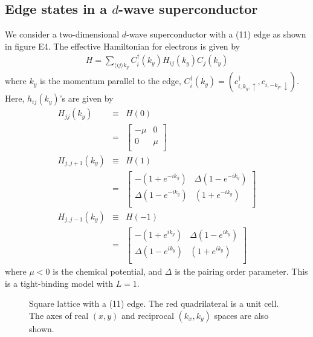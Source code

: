 \documentclass[aps,pra,amsmath,twocolumn,showpacs,bibnotes,10pt]{revtex4-1}
\begin{document}
\subsection{Edge states in a $d$-wave superconductor}

We consider a two-dimensional $d$-wave superconductor with a (11) edge as shown in figure E4. The effective Hamiltonian for electrons is given by 
\begin{eqnarray}
H = \sum_{\langle ij\rangle k_y}C^{\dagger}_i(k_y)H_{ij}(k_y)C_j(k_y) \label{hms}
\end{eqnarray}
where $k_y$ is the momentum parallel to the edge, $C^{\dagger}_i (k_y)= (c^{\dagger}_{i,k_y,\uparrow},c_{i,-k_y,\downarrow})$. Here, $h_{ij}(k_y)$'s are given by 
\begin{eqnarray}
H_{jj}(k_y) &\equiv& H(0) \nonumber\\
&=& \begin{bmatrix}
	-\mu&0\\
	0&\mu\\
\end{bmatrix}\nonumber\\
H_{j,j+1}(k_y) &\equiv& H(1) \nonumber\\
&=& \begin{bmatrix}
	-(1+e^{-ik_y})&\Delta(1-e^{-ik_y})\\
	\Delta(1-e^{-ik_y})&(1+e^{-ik_y})\\
\end{bmatrix}\nonumber\\
H_{j,j-1}(k_y) &\equiv& H(-1)\nonumber\\
&=&\begin{bmatrix}
	-(1+e^{ik_y})&\Delta(1-e^{ik_y})\\
	\Delta(1-e^{ik_y})&(1+e^{ik_y})\\
\end{bmatrix}\nonumber
\end{eqnarray}
where $\mu < 0$ is the chemical potential, and $\Delta$ is the pairing order parameter. This is a tight-binding model with $L = 1$.

\begin{figure}[t]
\centerline{}
\caption{Square lattice with a (11) edge. The red quadrilateral is a unit cell. The axes of real $(x,y)$ and reciprocal $(k_x,k_y)$ spaces are also shown.}
\end{figure}
\end{document}
